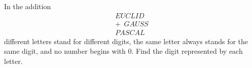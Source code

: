 In the addition
\[
\begin{array}{r}
EUCLID\\
+\ \ GAUSS\\
\hline
PASCAL
\end{array}
\]
different letters stand for different digits, the same letter always stands for the same digit, and no number begins with $0$. Find the digit represented by each letter.
